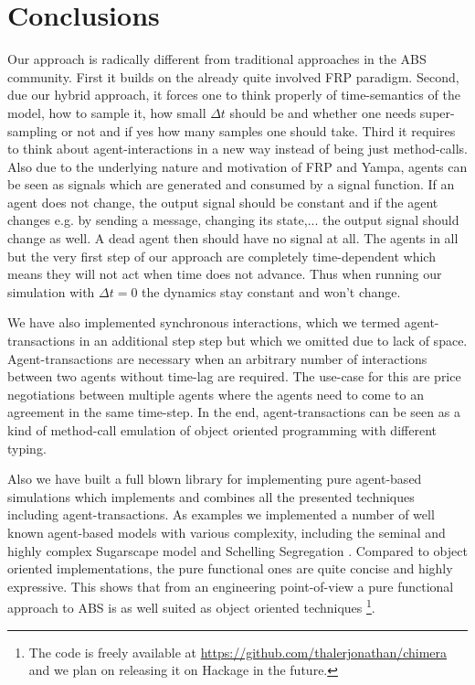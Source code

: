 \section{Conclusions}
Our approach is radically different from traditional approaches in the ABS community. First it builds on the already quite involved FRP paradigm. Second, due our hybrid approach, it forces one to think properly of time-semantics of the model, how to sample it, how small $\Delta t$ should be and whether one needs super-sampling or not and if yes how many samples one should take. Third it requires to think about agent-interactions in a new way instead of being just method-calls. Also due to the underlying nature and motivation of FRP and Yampa, agents can be seen as signals which are generated and consumed by a signal function. If an agent does not change, the output signal should be constant and if the agent changes e.g. by sending a message, changing its state,... the output signal should change as well. A dead agent then should have no signal at all. The agents in all but the very first step of our approach are completely time-dependent which means they will not act when time does not advance. Thus when running our simulation with $\Delta t = 0$ the dynamics stay constant and won't change.

We have also implemented synchronous interactions, which we termed agent-transactions in an additional step step but which we omitted due to lack of space. Agent-transactions are necessary when an arbitrary number of interactions between two agents without time-lag are required. The use-case for this are price negotiations between multiple agents where the agents need to come to an agreement in the same time-step. In the end, agent-transactions can be seen as a kind of method-call emulation of object oriented programming with different typing.

Also we have built a full blown library for implementing pure agent-based simulations which implements and combines all the presented techniques including agent-transactions. As examples we implemented a number of well known agent-based models with various complexity, including the seminal and highly complex Sugarscape model \cite{epstein_growing_1996} and Schelling Segregation \cite{schelling_dynamic_1971}. Compared to object oriented implementations, the pure functional ones are quite concise and highly expressive. This shows that from an engineering point-of-view a pure functional approach to ABS is as well suited as object oriented techniques \footnote{The code is freely available at \url{https://github.com/thalerjonathan/chimera} and we plan on releasing it on Hackage in the future.}.

